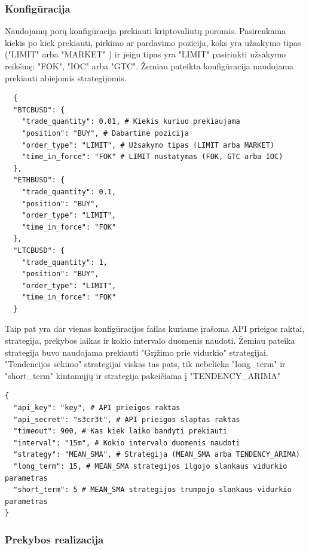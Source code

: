 \documentclass{VUMIFInfKursinis}
\begin{document}
\subsubsection{Konfigūracija}
Naudojamų porų konfigūracija prekiauti kriptovaliutų poromis. Pasirenkama kiekis po kiek prekiauti, pirkimo ar pardavimo pozicija, koks yra užsakymo
tipas ("LIMIT" arba "MARKET" ) ir jeigu tipas yra "LIMIT" pasirinkti užsakymo reikšmę: "FOK", "IOC" arba "GTC". Žemiau pateikta konfigūracija naudojama 
prekiauti abiejomis strategijomis.

\begin{verbatim}
  {
  "BTCBUSD": {
    "trade_quantity": 0.01, # Kiekis kuriuo prekiaujama
    "position": "BUY", # Dabartinė pozicija
    "order_type": "LIMIT", # Užsakymo tipas (LIMIT arba MARKET)
    "time_in_force": "FOK" # LIMIT nustatymas (FOK, GTC arba IOC)
  },
  "ETHBUSD": {
    "trade_quantity": 0.1,
    "position": "BUY",
    "order_type": "LIMIT",
    "time_in_force": "FOK"
  },
  "LTCBUSD": {
    "trade_quantity": 1,
    "position": "BUY",
    "order_type": "LIMIT",
    "time_in_force": "FOK"
  }
\end{verbatim}

Taip pat yra dar vienas konfigūracijos failas kuriame įrašoma API prieigos raktai, strategija, prekybos laikas ir kokio intervalo duomenis naudoti. Žemiau pateika 
strategija buvo naudojama prekiauti "Grįžimo prie vidurkio" strategijai. "Tendencijos sekimo" strategijai viskas tas pats, tik nebelieka "long\_term" ir "short\_term"
kintamųjų ir strategija pakeičiama į "TENDENCY\_ARIMA" 

\begin{verbatim}
{
  "api_key": "key", # API prieigos raktas
  "api_secret": "s3cr3t", # API prieigos slaptas raktas
  "timeout": 900, # Kas kiek laiko bandyti prekiauti
  "interval": "15m", # Kokio intervalo duomenis naudoti
  "strategy": "MEAN_SMA", # Strategija (MEAN_SMA arba TENDENCY_ARIMA)
  "long_term": 15, # MEAN_SMA strategijos ilgojo slankaus vidurkio parametras
  "short_term": 5 # MEAN_SMA strategijos trumpojo slankaus vidurkio parametras
}
\end{verbatim}

\subsubsection{Prekybos realizacija}
\end{document}
